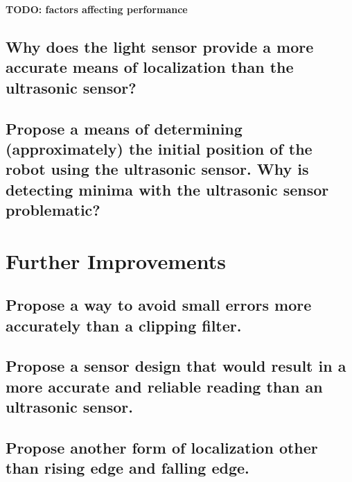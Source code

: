 \documentclass[11pt]{article}
\begin{document}
\textbf{TODO: factors affecting performance}

\subsection{Why does the light sensor provide a more accurate means of localization than the
ultrasonic sensor?}

\subsection{Propose a means of determining (approximately) the initial position of the robot using
the ultrasonic sensor. Why is detecting minima with the ultrasonic sensor problematic?}

\section{Further Improvements}
\subsection{Propose a way to avoid small errors more accurately than a clipping filter.}

\subsection{Propose a sensor design that would result in a more accurate and reliable reading than
an ultrasonic sensor.}

\subsection{Propose another form of localization other than rising edge and falling edge.}
\end{document}
